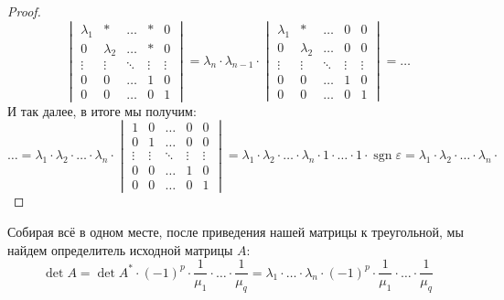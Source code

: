 \documentclass[12pt]{article}
\newcommand{\VE}{\varepsilon}
\theoremstyle{definition}
\DeclareMathOperator{\sgn}{sgn}
\begin{document}
\begin{proof}
$$\begin{vmatrix}
			\lambda_1 & * & \dotsc & * &  0 \\
			0 & \lambda_2 &  \dotsc & * & 0\\
			\vdots & \vdots & \ddots & \vdots & \vdots\\
			0 & 0 & \dotsc & 1 & 0\\
			0 & 0 & \dotsc & 0 & 1
		\end{vmatrix}= 
		\lambda_n{\cdot}\lambda_{n-1}{\cdot}
		\begin{vmatrix}
			\lambda_1 & * & \dotsc & 0 &  0 \\
			0 & \lambda_2 &  \dotsc & 0 & 0\\
			\vdots & \vdots & \ddots & \vdots & \vdots\\
			0 & 0 & \dotsc & 1 & 0\\
			0 & 0 & \dotsc & 0 & 1
		\end{vmatrix} = \dotsc 
	$$
	И так далее, в итоге мы получим:
	$$
		\dotsc = \lambda_1{\cdot}\lambda_2{\cdot}\dotsc{\cdot} \lambda_n{\cdot}
		\begin{vmatrix}
			1 & 0 & \dotsc & 0 &  0 \\
			0 & 1 &  \dotsc & 0 & 0\\
			\vdots & \vdots & \ddots & \vdots & \vdots\\
			0 & 0 & \dotsc & 1 & 0\\
			0 & 0 & \dotsc & 0 & 1
		\end{vmatrix} = \lambda_1{\cdot}\lambda_2{\cdot}\dotsc{\cdot} \lambda_n{\cdot}1{\cdot}\dotsc{\cdot}1{\cdot}\sgn{\VE} = \lambda_1{\cdot}\lambda_2{\cdot}\dotsc{\cdot} \lambda_n{\cdot}
	$$
\end{proof}
Собирая всё в одном месте, после приведения нашей матрицы к треугольной, мы найдем определитель исходной матрицы $A$:
$$
	\det{A} = \det{A^*}{\cdot}(-1)^p{\cdot}\dfrac{1}{\mu_1}{\cdot}\dotsc{\cdot}\dfrac{1}{\mu_q}= \lambda_1{\cdot}\dotsc{\cdot}\lambda_n{\cdot}(-1)^p{\cdot}\dfrac{1}{\mu_1}{\cdot}\dotsc{\cdot}\dfrac{1}{\mu_q}
$$
\end{document}
